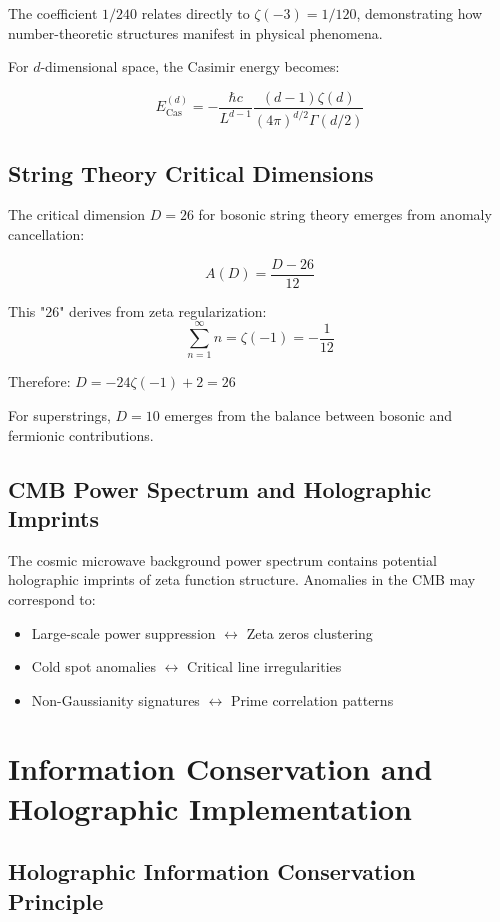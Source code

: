 \documentclass[12pt]{article}
\begin{document}
The coefficient $1/240$ relates directly to $\zeta(-3) = 1/120$, demonstrating how number-theoretic structures manifest in physical phenomena.

For $d$-dimensional space, the Casimir energy becomes:

$$E_{\text{Cas}}^{(d)} = -\frac{\hbar c}{L^{d-1}} \frac{(d-1)\zeta(d)}{(4\pi)^{d/2} \Gamma(d/2)}$$

\subsection{String Theory Critical Dimensions}

The critical dimension $D = 26$ for bosonic string theory emerges from anomaly cancellation:

$$A(D) = \frac{D - 26}{12}$$

This "26" derives from zeta regularization:
$$\sum_{n=1}^{\infty} n = \zeta(-1) = -\frac{1}{12}$$

Therefore: $D = -24 \zeta(-1) + 2 = 26$

For superstrings, $D = 10$ emerges from the balance between bosonic and fermionic contributions.

\subsection{CMB Power Spectrum and Holographic Imprints}

The cosmic microwave background power spectrum contains potential holographic imprints of zeta function structure. Anomalies in the CMB may correspond to:

\begin{itemize}
\item Large-scale power suppression $\leftrightarrow$ Zeta zeros clustering
\item Cold spot anomalies $\leftrightarrow$ Critical line irregularities
\item Non-Gaussianity signatures $\leftrightarrow$ Prime correlation patterns
\end{itemize}

\section{Information Conservation and Holographic Implementation}

\subsection{Holographic Information Conservation Principle}
\end{document}

